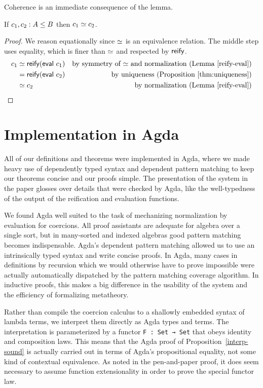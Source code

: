 \documentclass[acmsmall,screen]{acmart}
\begin{document}
Coherence is an immediate consequence of the lemma.
\begin{theorem}\label{thm:coherence}
  If \(c_1, c_2 : A \leq B\) then \(c_1 \simeq c_2\).
\end{theorem}
\begin{proof}
  We reason equationally since \(\simeq\) is an equivalence relation.  The
  middle step uses equality, which is finer than \(\simeq\) and respected by
  \(\mathsf{reify}\).
  \begin{align*}
    c_1 &\simeq \mathsf{reify} (\mathsf{eval}\ c_1) & \text{by symmetry of \(\simeq\) and normalization (Lemma~\ref{reify-eval})}&\\
    &= \mathsf{reify} (\mathsf{eval}\ c_2) & \text{by uniqueness (Proposition~\ref{thm:uniqueness})} &\\
    &\simeq c_2 & \text{by normalization (Lemma~\ref{reify-eval})} &\qedhere
  \end{align*}
\end{proof}

\section{Implementation in Agda}
All of our definitions and theorems were implemented in Agda,
where we made heavy use of dependently typed syntax and dependent pattern matching
to keep our theorems concise and our proofs simple.
The presentation of the system in the paper glosses over details that were
checked by Agda, like the well-typedness of the output of the reification and
evaluation functions.

We found Agda well suited to the task of mechanizing normalization by evaluation
for coercions. All proof assistants are adequate for algebra over a single sort,
but in many-sorted and indexed algebras good pattern matching becomes indispensable.
Agda's dependent pattern matching allowed us to use an intrinsically typed syntax
and write concise proofs. In Agda, many cases in definitions by recursion which
we would otherwise have to prove impossible were actually automatically dispatched
by the pattern matching coverage algorithm.  In inductive proofs, this makes a
big difference in the usability of the system and the efficiency of formalizing
metatheory.

Rather than compile the coercion calculus to a shallowly embedded syntax of
lambda terms, we interpret them directly as Agda types and terms. The
interpretation is parameterized by a functor \texttt{F~:~Set~→~Set} that obeys
identity and composition laws. This means that the Agda proof of
Proposition~\ref{interp-sound} is actually carried out in terms of Agda's
propositional equality, not some kind of contextual equivalence. As noted in the
pen-and-paper proof, it does seem necessary to assume function extensionality in
order to prove the special functor law.
\end{document}

